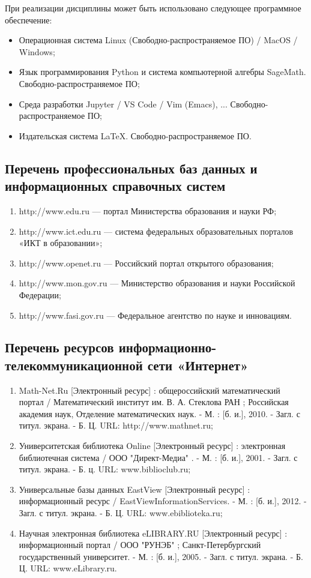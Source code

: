 \documentclass[a4paper, 12pt]{article}
\begin{document}
При реализации дисциплины может быть использовано следующее программное обеспечение:
\begin{itemize}
    \item Операционная система Linux (Свободно-распространяемое ПО) / MacOS / Windows;
    \item Язык программирования Python и система компьютерной алгебры SageMath. Свободно-распространяемое ПО;
    \item Среда разработки Jupyter / VS Code / Vim (Emacs), ... Свободно-распространяемое ПО;
    \item Издательская система LaTeX. Свободно-распространяемое ПО.
\end{itemize}

\subsection{Перечень профессиональных баз данных и информационных справочных систем}

\begin{enumerate}
    \item http://www.edu.ru --- портал Министерства образования и науки РФ;
    \item http://www.ict.edu.ru --- система федеральных образовательных порталов «ИКТ в образовании»;
    \item http://www.openet.ru --- Российский портал открытого образования;
    \item http://www.mon.gov.ru  --- Министерство образования и науки Российской Федерации;
    \item http://www.fasi.gov.ru --- Федеральное агентство по науке и инновациям.
\end{enumerate}

\subsection{Перечень ресурсов информационно-телекоммуникационной сети «Интернет»}

\begin{enumerate}
    \item Math-Net.Ru [Электронный ресурс] : общероссийский математический портал / Математический институт им. В. А. Стеклова РАН ; Российская академия наук, Отделение математических наук. - М. : [б. и.], 2010. - Загл. с титул. экрана. - Б. Ц. URL: http://www.mathnet.ru;
    \item Университетская библиотека Online [Электронный ресурс] : электронная библиотечная система / ООО "Директ-Медиа" . - М. : [б. и.], 2001. - Загл. с титул. экрана. - Б. ц.  URL: www.biblioclub.ru;
    \item Универсальные базы данных EastView [Электронный ресурс] : информационный ресурс / EastViewInformationServices. - М. : [б. и.], 2012. - Загл. с титул. экрана. - Б. Ц. URL: www.ebiblioteka.ru;
    \item Научная электронная библиотека eLIBRARY.RU [Электронный ресурс] : информационный портал / ООО "РУНЭБ" ; Санкт-Петербургский государственный университет. - М. : [б. и.], 2005. - Загл. с титул. экрана. - Б. Ц. URL: www.eLibrary.ru.
\end{enumerate}
\end{document}
